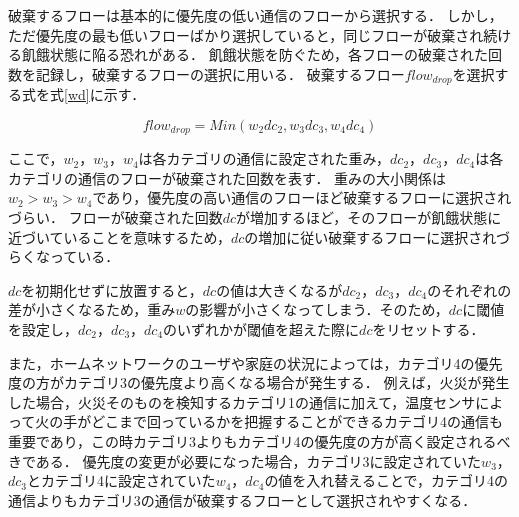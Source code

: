 \documentclass[a4paper,11pt,uplatex]{ujreport}
\begin{document}

  破棄するフローは基本的に優先度の低い通信のフローから選択する．
  しかし，ただ優先度の最も低いフローばかり選択していると，同じフローが破棄され続ける飢餓状態に陥る恐れがある．
  飢餓状態を防ぐため，各フローの破棄された回数を記録し，破棄するフローの選択に用いる．
  破棄するフロー$flow_{drop}$を選択する式を式\ref{wd}に示す．\par

  \begin{equation}
    flow_{drop} = Min(w_2 dc_2, w_3 dc_3, w_4 dc_4)
    \label{wd}
  \end{equation}

  ここで，$w_2$，$w_3$，$w_4$は各カテゴリの通信に設定された重み，$dc_2$，$dc_3$，$dc_4$は各カテゴリの通信のフローが破棄された回数を表す．
  重みの大小関係は$w_2 > w_3 > w_4$であり，優先度の高い通信のフローほど破棄するフローに選択されづらい．
  フローが破棄された回数$dc$が増加するほど，そのフローが飢餓状態に近づいていることを意味するため，$dc$の増加に従い破棄するフローに選択されづらくなっている．\par
  $dc$を初期化せずに放置すると，$dc$の値は大きくなるが$dc_2$，$dc_3$，$dc_4$のそれぞれの差が小さくなるため，重み$w$の影響が小さくなってしまう．そのため，$dc$に閾値を設定し，$dc_2$，$dc_3$，$dc_4$のいずれかが閾値を超えた際に$dc$をリセットする．\par
  また，ホームネットワークのユーザや家庭の状況によっては，カテゴリ4の優先度の方がカテゴリ3の優先度より高くなる場合が発生する．
  例えば，火災が発生した場合，火災そのものを検知するカテゴリ1の通信に加えて，温度センサによって火の手がどこまで回っているかを把握することができるカテゴリ4の通信も重要であり，この時カテゴリ3よりもカテゴリ4の優先度の方が高く設定されるべきである．
  優先度の変更が必要になった場合，カテゴリ3に設定されていた$w_3$，$dc_3$とカテゴリ4に設定されていた$w_4$，$dc_4$の値を入れ替えることで，カテゴリ4の通信よりもカテゴリ3の通信が破棄するフローとして選択されやすくなる．


\end{document}
